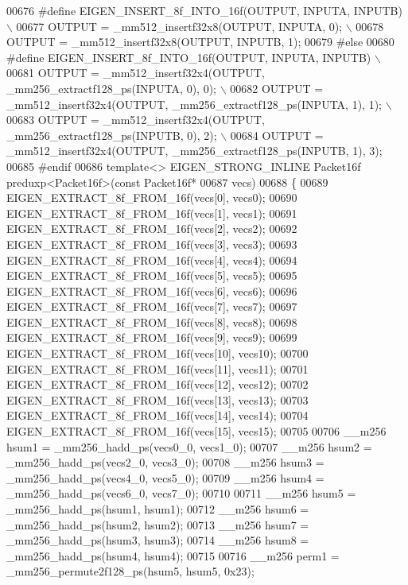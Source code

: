 \begin{DoxyCode}
00676 \textcolor{preprocessor}{#define EIGEN\_INSERT\_8f\_INTO\_16f(OUTPUT, INPUTA, INPUTB) \(\backslash\)}
00677 \textcolor{preprocessor}{  OUTPUT = \_mm512\_insertf32x8(OUTPUT, INPUTA, 0);        \(\backslash\)}
00678 \textcolor{preprocessor}{  OUTPUT = \_mm512\_insertf32x8(OUTPUT, INPUTB, 1);}
00679 \textcolor{preprocessor}{#else}
00680 \textcolor{preprocessor}{#define EIGEN\_INSERT\_8f\_INTO\_16f(OUTPUT, INPUTA, INPUTB)                    \(\backslash\)}
00681 \textcolor{preprocessor}{  OUTPUT = \_mm512\_insertf32x4(OUTPUT, \_mm256\_extractf128\_ps(INPUTA, 0), 0); \(\backslash\)}
00682 \textcolor{preprocessor}{  OUTPUT = \_mm512\_insertf32x4(OUTPUT, \_mm256\_extractf128\_ps(INPUTA, 1), 1); \(\backslash\)}
00683 \textcolor{preprocessor}{  OUTPUT = \_mm512\_insertf32x4(OUTPUT, \_mm256\_extractf128\_ps(INPUTB, 0), 2); \(\backslash\)}
00684 \textcolor{preprocessor}{  OUTPUT = \_mm512\_insertf32x4(OUTPUT, \_mm256\_extractf128\_ps(INPUTB, 1), 3);}
00685 \textcolor{preprocessor}{#endif}
00686 \textcolor{keyword}{template}<> EIGEN\_STRONG\_INLINE Packet16f preduxp<Packet16f>(\textcolor{keyword}{const} Packet16f*
00687 vecs)
00688 \{
00689   EIGEN\_EXTRACT\_8f\_FROM\_16f(vecs[0], vecs0);
00690   EIGEN\_EXTRACT\_8f\_FROM\_16f(vecs[1], vecs1);
00691   EIGEN\_EXTRACT\_8f\_FROM\_16f(vecs[2], vecs2);
00692   EIGEN\_EXTRACT\_8f\_FROM\_16f(vecs[3], vecs3);
00693   EIGEN\_EXTRACT\_8f\_FROM\_16f(vecs[4], vecs4);
00694   EIGEN\_EXTRACT\_8f\_FROM\_16f(vecs[5], vecs5);
00695   EIGEN\_EXTRACT\_8f\_FROM\_16f(vecs[6], vecs6);
00696   EIGEN\_EXTRACT\_8f\_FROM\_16f(vecs[7], vecs7);
00697   EIGEN\_EXTRACT\_8f\_FROM\_16f(vecs[8], vecs8);
00698   EIGEN\_EXTRACT\_8f\_FROM\_16f(vecs[9], vecs9);
00699   EIGEN\_EXTRACT\_8f\_FROM\_16f(vecs[10], vecs10);
00700   EIGEN\_EXTRACT\_8f\_FROM\_16f(vecs[11], vecs11);
00701   EIGEN\_EXTRACT\_8f\_FROM\_16f(vecs[12], vecs12);
00702   EIGEN\_EXTRACT\_8f\_FROM\_16f(vecs[13], vecs13);
00703   EIGEN\_EXTRACT\_8f\_FROM\_16f(vecs[14], vecs14);
00704   EIGEN\_EXTRACT\_8f\_FROM\_16f(vecs[15], vecs15);
00705 
00706   \_\_m256 hsum1 = \_mm256\_hadd\_ps(vecs0\_0, vecs1\_0);
00707   \_\_m256 hsum2 = \_mm256\_hadd\_ps(vecs2\_0, vecs3\_0);
00708   \_\_m256 hsum3 = \_mm256\_hadd\_ps(vecs4\_0, vecs5\_0);
00709   \_\_m256 hsum4 = \_mm256\_hadd\_ps(vecs6\_0, vecs7\_0);
00710 
00711   \_\_m256 hsum5 = \_mm256\_hadd\_ps(hsum1, hsum1);
00712   \_\_m256 hsum6 = \_mm256\_hadd\_ps(hsum2, hsum2);
00713   \_\_m256 hsum7 = \_mm256\_hadd\_ps(hsum3, hsum3);
00714   \_\_m256 hsum8 = \_mm256\_hadd\_ps(hsum4, hsum4);
00715 
00716   \_\_m256 perm1 = \_mm256\_permute2f128\_ps(hsum5, hsum5, 0x23);

\end{DoxyCode}
